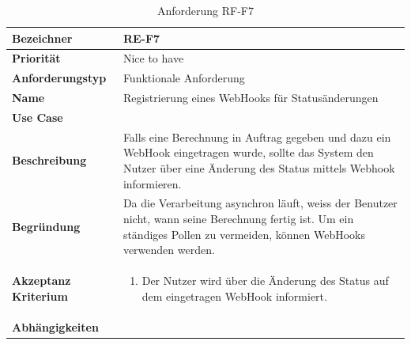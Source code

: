 \begin{table}[ht]
\centering
  \begin{tabular}{ l | p{8cm} }
	\hline
	\rowcolor{gray}
	\textbf{Bezeichner}&	\textbf{RE-F7}\\ \hline
	\textbf{Priorität} 		&	Nice to have\\ \hline
	\textbf{Anforderungstyp}	&	Funktionale Anforderung\\ \hline
	\textbf{Name} 			&	Registrierung eines WebHooks für Statusänderungen\\ \hline
	\textbf{Use Case} 		&	\nameref{table:use_case_4}\\ \hline
	\textbf{Beschreibung} 	&	Falls eine Berechnung in Auftrag gegeben und dazu ein WebHook eingetragen wurde, sollte das System den Nutzer über eine Änderung des Status mittels 
						Webhook informieren.\\ \hline
	\textbf{Begründung} 		&	Da die Verarbeitung asynchron läuft, weiss der Benutzer nicht, wann seine Berechnung fertig ist. Um ein ständiges Pollen zu vermeiden, können 
							WebHooks verwenden werden.\\ \hline
	\textbf{Akzeptanz Kriterium}	&	\begin{enumerate}
					\item Der Nutzer wird über die Änderung des Status auf dem eingetragen WebHook informiert.
					\end{enumerate}
					\\ \hline
	\textbf{Abhängigkeiten} 	&	\nameref{table:req_2}\\ \hline
  \end{tabular}
   \caption{Anforderung RF-F7}\label{table:req_7}
\end{table}

